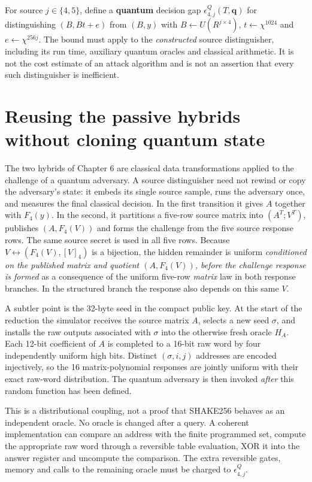 \documentclass[
  11pt,
  a4paper,
  oneside]{report}
\begin{document}
For source \(j\in\{4,5\}\), define a \textbf{quantum} decision gap
\(\epsilon_{4,j}^{Q}(T,\mathbf q)\) for distinguishing \((B,Bt+e)\) from
\((B,y)\) with \(B\leftarrow U(R^{j\times4})\),
\(t\leftarrow\chi^{1024}\) and \(e\leftarrow\chi^{256j}\). The bound
must apply to the \emph{constructed} source distinguisher, including its
run time, auxiliary quantum oracles and classical arithmetic. It is not
the cost estimate of an attack algorithm and is not an assertion that
every such distinguisher is inefficient.

\section{Reusing the passive hybrids without cloning quantum
state}\label{reusing-the-passive-hybrids-without-cloning-quantum-state}

The two hybrids of Chapter 6 are classical data transformations applied
to the challenge of a quantum adversary. A source distinguisher need not
rewind or copy the adversary's state: it embeds its single source
sample, runs the adversary once, and measures the final classical
decision. In the first transition it gives \(A\) together with
\(F_4(y)\). In the second, it partitions a five-row source matrix into
\((A^T;V^T)\), publishes \((A,F_4(V))\) and forms the challenge from the
five source response rows. The same source secret is used in all five
rows. Because \(V\leftrightarrow(F_4(V),[V]_4)\) is a bijection, the
hidden remainder is uniform \emph{conditioned on the published matrix
and quotient \((A,F_4(V))\), before the challenge response is formed} as
a consequence of the uniform five-row \emph{matrix} law in both response
branches. In the structured branch the response also depends on this
same \(V\).

A subtler point is the 32-byte seed in the compact public key. At the
start of the reduction the simulator receives the source matrix \(A\),
selects a new seed \(\sigma\), and installs the raw outputs associated
with \(\sigma\) into the otherwise fresh oracle \(H_A\). Each 12-bit
coefficient of \(A\) is completed to a 16-bit raw word by four
independently uniform high bits. Distinct \((\sigma,i,j)\) addresses are
encoded injectively, so the 16 matrix-polynomial responses are jointly
uniform with their exact raw-word distribution. The quantum adversary is
then invoked \emph{after} this random function has been defined.

This is a distributional coupling, not a proof that SHAKE256 behaves as
an independent oracle. No oracle is changed after a query. A coherent
implementation can compare an address with the finite programmed set,
compute the appropriate raw word through a reversible table evaluation,
XOR it into the answer register and uncompute the comparison. The extra
reversible gates, memory and calls to the remaining oracle must be
charged to \(\epsilon_{4,j}^{Q}\).
\end{document}
